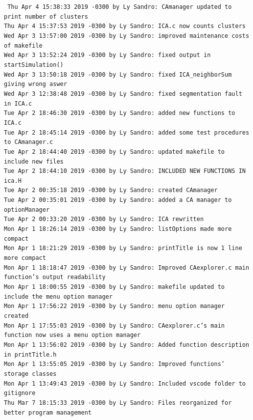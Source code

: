 \documentclass[12pt,a4paper,final]{article}
\begin{document}
\texttt{\small
Thu Apr 4 15:38:33 2019 -0300 by Ly Sandro: CAmanager updated to print number of clusters\\
Thu Apr 4 15:37:53 2019 -0300 by Ly Sandro: ICA.c now counts clusters\\
Wed Apr 3 13:57:00 2019 -0300 by Ly Sandro: improved maintenance costs of makefile\\
Wed Apr 3 13:52:24 2019 -0300 by Ly Sandro: fixed output in startSimulation()\\
Wed Apr 3 13:50:18 2019 -0300 by Ly Sandro: fixed ICA\_neighborSum giving wrong aswer\\
Wed Apr 3 12:38:48 2019 -0300 by Ly Sandro: fixed segmentation fault in ICA.c\\
Tue Apr 2 18:46:30 2019 -0300 by Ly Sandro: added new functions to ICA.c\\
Tue Apr 2 18:45:14 2019 -0300 by Ly Sandro: added some test procedures to CAmanager.c\\
Tue Apr 2 18:44:40 2019 -0300 by Ly Sandro: updated makefile to include new files\\
Tue Apr 2 18:44:10 2019 -0300 by Ly Sandro: INCLUDED NEW FUNCTIONS IN ica.H\\
Tue Apr 2 00:35:18 2019 -0300 by Ly Sandro: created CAmanager\\
Tue Apr 2 00:35:01 2019 -0300 by Ly Sandro: added a CA manager to optionManager\\
Tue Apr 2 00:33:20 2019 -0300 by Ly Sandro: ICA rewritten\\
Mon Apr 1 18:26:14 2019 -0300 by Ly Sandro: listOptions made more compact\\
Mon Apr 1 18:21:29 2019 -0300 by Ly Sandro: printTitle is now 1 line more compact\\
Mon Apr 1 18:18:47 2019 -0300 by Ly Sandro: Improved CAexplorer.c main function's output readability\\
Mon Apr 1 18:00:55 2019 -0300 by Ly Sandro: makefile updated to include the menu option manager\\
Mon Apr 1 17:56:22 2019 -0300 by Ly Sandro: menu option manager created\\
Mon Apr 1 17:55:03 2019 -0300 by Ly Sandro: CAexplorer.c's main function now uses a menu option manager\\
Mon Apr 1 13:56:02 2019 -0300 by Ly Sandro: Added function description in printTitle.h\\
Mon Apr 1 13:55:05 2019 -0300 by Ly Sandro: Improved functions' storage classes\\
Mon Apr 1 13:49:43 2019 -0300 by Ly Sandro: Included vscode folder to gitignore\\
Thu Mar 7 18:15:33 2019 -0300 by Ly Sandro: Files reorganized for better program management\\
}
\end{document}
